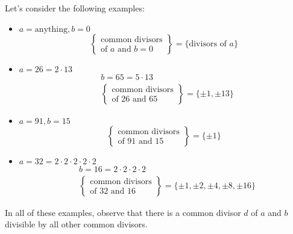 \documentclass[11pt]{article}
\begin{document}
\begin{example}
    Let's consider the following examples:
    \begin{itemize}
        \item \(a = \text{anything}, b = 0\)
              \[
                  \left\{
                  \begin{array}{l}
                      \text{common divisors} \\
                      \text{of } a \text{ and } b = 0
                  \end{array}
                  \right\} = \{ \text{divisors of } a \}
              \]

        \item \(a = 26 = 2 \cdot 13\)
              \[
                  \begin{aligned}
                       & b = 65 = 5 \cdot 13 \\
                       & \left\{
                      \begin{array}{l}
                          \text{common divisors} \\
                          \text{of } 26 \text{ and } 65
                      \end{array}
                      \right\} = \{ \pm 1, \pm 13 \}
                  \end{aligned}
              \]

        \item \(a = 91, b = 15\)
              \[
                  \left\{
                  \begin{array}{l}
                      \text{common divisors} \\
                      \text{of } 91 \text{ and } 15
                  \end{array}
                  \right\} = \{ \pm 1 \}
              \]

        \item \(a = 32 = 2 \cdot 2 \cdot 2 \cdot 2 \cdot 2\)
              \[
                  \begin{aligned}
                       & b = 16 = 2 \cdot 2 \cdot 2 \cdot 2 \\
                       & \left\{
                      \begin{array}{l}
                          \text{common divisors} \\
                          \text{of } 32 \text{ and } 16
                      \end{array}
                      \right\} = \{ \pm 1, \pm 2, \pm 4, \pm 8, \pm 16 \}
                  \end{aligned}
              \]
    \end{itemize}

    In all of these examples, observe that there is a common divisor \(d\) of \(a\)
    and \(b\) divisible by all other common divisors.
\end{example}
\end{document}
